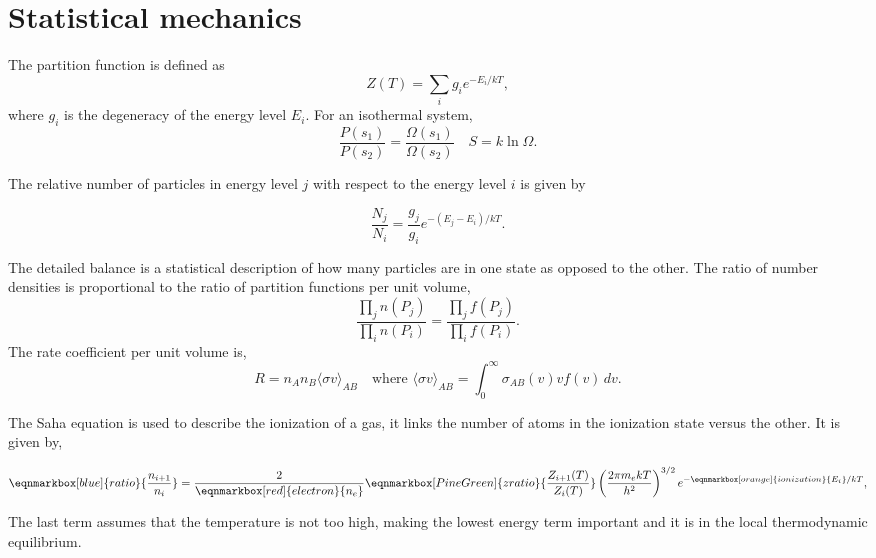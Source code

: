 \section*{Statistical mechanics}
The \textsf{partition function} is defined as 
\begin{equation}
  Z(T) = \sum_i g_i e^{-E_i/kT},
\end{equation}
where $g_i$ is the degeneracy of the energy level $E_i$. For an isothermal system, 
\begin{equation}
  \frac{P(s_1)}{P(s_2)} = \frac{\Omega(s_1)}{\Omega(s_2)} \quad S = k\ln\Omega.
\end{equation}

The relative number of particles in energy level $j$ with respect to the energy level $i$ is given by
\begin{definition}
\begin{equation}
  \frac{N_j}{N_i} = \frac{g_j}{g_i}e^{-(E_j-E_i)/kT}. 
\end{equation}
\vspace{-5mm}
\end{definition}
The \textsf{detailed balance} is a statistical description of how many particles are in one state as opposed to the other. The ratio of number densities is proportional to the ratio of partition functions per unit volume, 
\begin{equation}
  \frac{\prod_j n(P_j)}{\prod_i n(P_i)} = \frac{\prod_j f(P_j)}{\prod_i f(P_i)}. 
\end{equation}
The \textsf{rate coefficient} per unit volume is, 
\begin{equation}
  R=n_A n_B \langle\sigma v\rangle_{AB} \quad \text{where } \langle\sigma v\rangle_{AB} = \int_0^\infty \sigma_{AB}(v)v f(v)\,dv.
\end{equation}

The Saha equation is used to describe the ionization of a gas, it links the number of atoms in the ionization state versus the other. It is given by,
\begin{definition}
\begin{equation}
  \eqnmarkbox[blue]{ratio}{\frac{n_{i+1}}{n_i}} = \frac{2}{\eqnmarkbox[red]{electron}{n_e}}\eqnmarkbox[PineGreen]{zratio}{\frac{Z_{i+1}(T)}{Z_i(T)}}\left(\frac{2\pi m_e kT}{h^2}\right)^{3/2}e^{-\eqnmarkbox[orange]{ionization}{E_i}/kT}, 
\end{equation}
\end{definition}
 The last term assumes that the temperature is not too high, making the lowest energy term important and it is in the \textsf{local thermodynamic equilibrium}.

